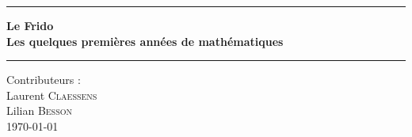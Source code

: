 

\thispagestyle{empty}
\begin{center}
  \begin{minipage}{15cm}
    \hrule\par
    \vspace{2mm}
    \begin{center}
        \Huge \bfseries Le Frido \\  {\small Les quelques premières années de mathématiques}
    \normalsize
    \end{center}
    \hrule\par
  \end{minipage}
\end{center}

\vspace{2cm}

\begin{center}
    Contributeurs :\\
    Laurent \textsc{Claessens} \\
    Lilian \textsc{Besson} \\
    \today\\
    \texttt{\GitCommitHexsha} 

    \vspace{1cm}

\end{center}

\vfill

 \LogoEtLicence

 \newpage



